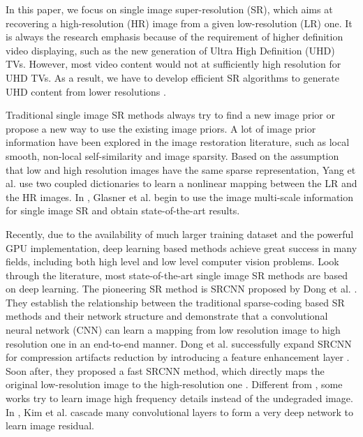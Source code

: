 \documentclass{article}
\begin{document}
In this paper, we focus on single image super-resolution (SR), which aims at recovering a high-resolution (HR) image from a given low-resolution (LR) one. It is always the research emphasis because of the requirement of higher definition video displaying, such as the new generation of Ultra High Definition (UHD) TVs. However, most video content would not at sufficiently high resolution for UHD TVs. As a result, we have to develop efficient SR algorithms to generate UHD content from lower resolutions \cite{ref1}.

Traditional single image SR methods always try to find a new image prior or propose a new way to use the existing image priors. A lot of image prior information have been explored in the image restoration literature, such as local smooth, non-local self-similarity and image sparsity. Based on the assumption that low and high resolution images have the same sparse representation, Yang et al. \cite{ref2} use two coupled dictionaries to learn a nonlinear mapping between the LR and the HR images. In \cite{ref3}, Glasner et al. begin to use the image multi-scale information for single image SR and obtain state-of-the-art results.

Recently, due to the availability of much larger training dataset and the powerful GPU implementation, deep learning based methods achieve great success in many fields, including both high level and low level computer vision problems. Look through the literature, most state-of-the-art single image SR methods are based on deep learning. The pioneering SR method is SRCNN proposed by Dong et al. \cite{ref4, ref5}. They establish the relationship between the traditional sparse-coding based SR methods and their network structure and demonstrate that a convolutional neural network (CNN) can learn a mapping from low resolution image to high resolution one in an end-to-end manner. Dong et al. successfully expand SRCNN for compression artifacts reduction by introducing a feature enhancement layer \cite{ref6}. Soon after, they proposed a fast SRCNN method, which directly maps the original low-resolution image to the high-resolution one \cite{ref7}. Different from \cite{ref4,ref5,ref6,ref7}, some works try to learn image high frequency details instead of the undegraded image. In \cite{ref9}, Kim et al. cascade many convolutional layers to form a very deep network to learn image residual.
\end{document}
